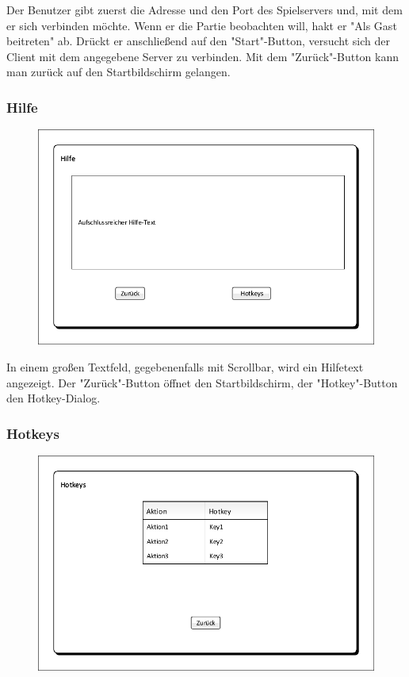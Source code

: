 Der Benutzer gibt zuerst die Adresse und den Port des Spielservers und, mit dem er sich verbinden möchte. Wenn er die Partie beobachten will, hakt er "Als Gast beitreten" ab. Drückt er anschließend auf den "Start"-Button, versucht sich der Client mit dem angegebene Server zu verbinden. Mit dem "Zurück"-Button kann man zurück auf den Startbildschirm gelangen.
	
\subsubsection{Hilfe}
\begin{figure}[H]
	\centering
	\includegraphics[scale=0.8]{images/Hilfe.pdf}
\end{figure}

In einem großen Textfeld, gegebenenfalls mit Scrollbar, wird ein Hilfetext angezeigt. Der "Zurück"-Button öffnet den Startbildschirm, der "Hotkey"-Button den Hotkey-Dialog.

\subsubsection{Hotkeys}
\begin{figure}[H]
	\centering
	\includegraphics[scale=0.8]{images/Hotkeys.pdf}
\end{figure}

